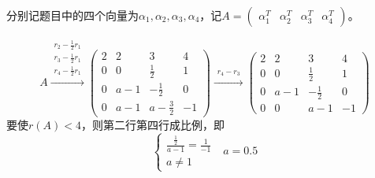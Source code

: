 \documentclass[a4paper]{report}
\begin{document}
\begin{jie}
分别记题目中的四个向量为$\alpha_1,\alpha_2,\alpha_3,\alpha_4$，记$A=
\begin{pmatrix}
\alpha_1^T&\alpha_2^T&\alpha_3^T&\alpha_4^T
\end{pmatrix}
$。

\begin{equation*}
A\xrightarrow{\substack{r_{2}-\frac{1}{2}r_{1}\\ r_{3}-\frac{1}{2}r_{1}\\ r_{4}-\frac{1}{2}r_{1}}}
{
\begin{pmatrix}
2& 2&3&4\\ 0&0&\frac{1}{2}&1\\ 0&a-1&-\frac{1}{2}&0\\ 0&a-1&a-\frac{3}{2}&-1
\end{pmatrix}
}\xrightarrow{\substack{r_{4}-r_{3}}}
{
\begin{pmatrix}
2& 2&3&4\\ 0&0&\frac{1}{2}&1\\ 0&a-1&-\frac{1}{2}&0\\ 0&0&a-1&-1
\end{pmatrix}
}
\end{equation*}
要使$r(A)<4$，则第二行第四行成比例，即
\begin{equation*}
\begin{cases}
\frac{\frac{1}{2}}{a-1}=\frac{1}{-1}\\
a\neq 1
\end{cases}~~~a=0.5
\end{equation*}

%
\end{jie}
\end{document}
